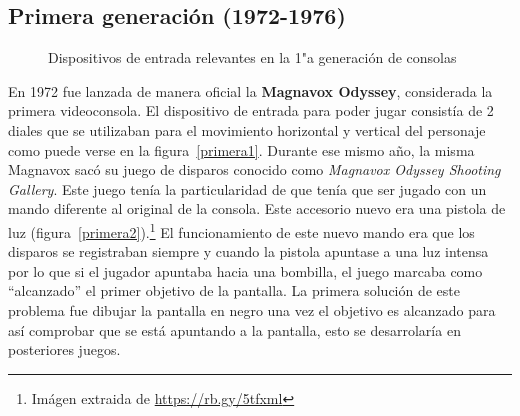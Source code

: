 \subsection{Primera generaci\'on (1972-1976)}

\begin{figure}[t]
     \hfill
     \caption{Dispositivos de entrada relevantes en la 1"a  generaci\'on de consolas}
     \label{fig:primera}
   \end{figure}

En 1972 fue lanzada de manera oficial la \textbf{Magnavox Odyssey}, considerada la primera videoconsola. El dispositivo de entrada para poder jugar consist\'ia de 2 diales que se utilizaban para el movimiento horizontal y vertical del personaje como puede verse en la figura~\ref{primera1}. Durante ese mismo a\~no, la misma Magnavox sac\'o su juego de disparos conocido como \textit{Magnavox Odyssey Shooting Gallery}. Este juego ten\'ia la particularidad de que ten\'ia que ser jugado con un mando diferente al original de la consola. Este accesorio nuevo era una pistola de luz (figura~\ref{primera2}).\footnote{Im\'agen extraida de \url{https://rb.gy/5tfxml}} El funcionamiento de este nuevo mando era que los disparos se registraban siempre y cuando la pistola apuntase a una luz intensa por lo que si el jugador apuntaba hacia una bombilla, el juego marcaba como ``alcanzado'' el primer objetivo de la pantalla. La primera soluci\'on de este problema fue dibujar la pantalla en negro una vez el objetivo es alcanzado para as\'i comprobar que se est\'a apuntando a la pantalla, esto se desarrolar\'ia en posteriores juegos. \\




